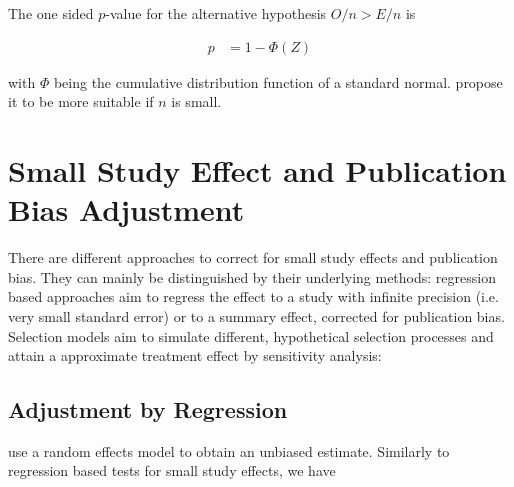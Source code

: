 \documentclass[11pt,a4paper,twoside]{book}\usepackage[]{graphicx}\usepackage[]{color}
\begin{document}
The one sided $p$-value for the alternative hypothesis $O/n > E/n$ is

\begin{align}
p &= 1 - \Phi(Z) \nonumber
\end{align}

with $\Phi$ being the cumulative distribution function of a standard normal. \citet{excess.significance} propose it to be more suitable if $n$ is small.











\section{Small Study Effect and Publication Bias Adjustment}
There are different approaches to correct for small study effects and publication bias. They can mainly be distinguished by their underlying methods: regression based approaches aim to regress the effect to a study with infinite precision (i.e. very small standard error) or to a summary effect, corrected for publication bias. Selection models aim to simulate different, hypothetical selection processes and attain a approximate treatment effect by sensitivity analysis:

\subsection{Adjustment by Regression}
\citet{limitmeta} use a random effects model %
to obtain an unbiased estimate. Similarly to 
regression based tests for small study effects, we have
\end{document}
